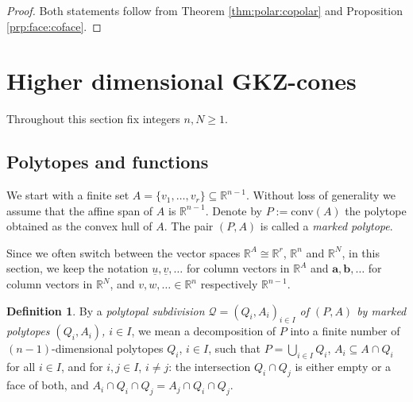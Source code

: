 \documentclass[12pt, a4article]{amsart}   	%
\numberwithin{equation}{section}
\theoremstyle{plain}
\theoremstyle{definition}
\newtheorem{definition}[theorem]{Definition}
\newcommand{\R}{{\mathbb R}}
\newcommand{\uu}{{\underline u}}
\newcommand{\uv}{{\underline v}}
\begin{document}
\begin{proof} 
Both statements follow from Theorem \ref{thm:polar:copolar} and Proposition \ref{prp:face:coface}.
\end{proof}



\section{Higher dimensional GKZ-cones}\label{sec:HiDiGKZ}

Throughout this section fix integers $n,N\geq 1$.

\subsection{Polytopes and functions}\label{subsec:polytopes:functions}
 
We start with a finite set $A=\{v_1,\ldots,v_r\}\subseteq \mathbb R^{n-1}$. Without loss of generality we assume that the affine span of $A$ is $\mathbb R^{n-1}$. Denote by $P := \mathrm{conv}(A)$ the polytope obtained as the convex hull of $A$. The pair $(P,A)$ is called a \emph{marked polytope}.

Since we often switch between the vector spaces $\mathbb R^A\cong\mathbb{R}^r$, $\mathbb R^n$ and $\mathbb R^N$, in this section, we keep the notation $\uu, \uv, \ldots$ for column vectors in $\mathbb R^A$ and  $\mathbf a, \mathbf b, \ldots$ for column vectors in $\mathbb R^N$, and $v,w,\ldots\in \R^n$  respectively $\mathbb R^{n-1}$.


\begin{definition}\label{def:polytopal:subdivision}
By a \emph{polytopal subdivision $\mathcal Q=(Q_i,A_i)_{i\in I}$ of $(P, A)$ by marked polytopes
$(Q_i,A_i)$, $i\in I$}, we mean a decomposition of $P$ into a finite number of $(n-1)$-dimensional 
polytopes $Q_i$, $i\in I$, such that $P=\bigcup_{i\in I} Q_i$, $A_i\subseteq A\cap Q_i$ for all $i\in I$, 
and for $i,j\in I$, $i\not=j$: 
the intersection $Q_i\cap Q_j$ is either empty or a face of both,  and $A_i\cap Q_i\cap Q_j=A_j\cap Q_i\cap Q_j$. 
\end{definition}
\end{document}

